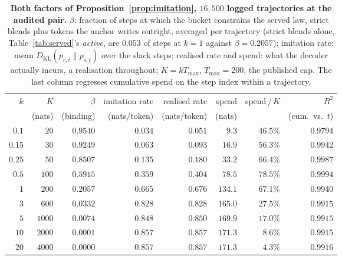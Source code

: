 \begin{table}[h]
\centering\footnotesize
\caption{\textbf{Both factors of Proposition~\ref{prop:imitation}, $16{,}500$ logged trajectories at the
audited pair.} $\beta$: fraction of steps at which the bucket constrains the served law, strict blends
plus tokens the anchor writes outright, averaged per trajectory (strict blends alone, Table~\ref{tab:served}'s
\emph{active}, are $0.053$ of steps at $k=1$ against $\beta = 0.2057$); imitation rate: mean
$D_{\mathrm{KL}}(p_{r,t}\|p_{s,t})$ over the slack steps; realised rate and spend: what the decoder
actually incurs, a realisation throughout; $K = kT_{\max}$, $T_{\max} = 200$, the published cap. The last
column regresses cumulative spend on the step index within a trajectory.}
\label{tab:imitation}
\setlength{\tabcolsep}{5pt}
\begin{tabular}{rrrrrrrr}
\toprule
$k$ & $K$ & $\beta$ & imitation rate & realised rate & spend & spend\,/\,$K$ & $R^2$ \\
 & (nats) & (binding) & (nats/token) & (nats/token) & (nats) & & (cum.\ vs.\ $t$) \\
\midrule
$0.1$ & $20$ & $0.9540$ & $0.034$ & $0.051$ & $9.3$ & $46.5\%$ & $0.9794$ \\
$0.15$ & $30$ & $0.9249$ & $0.063$ & $0.093$ & $16.9$ & $56.3\%$ & $0.9942$ \\
$0.25$ & $50$ & $0.8507$ & $0.135$ & $0.180$ & $33.2$ & $66.4\%$ & $0.9987$ \\
$0.5$ & $100$ & $0.5915$ & $0.359$ & $0.404$ & $78.5$ & $78.5\%$ & $0.9994$ \\
$1$ & $200$ & $0.2057$ & $0.665$ & $0.676$ & $134.1$ & $67.1\%$ & $0.9940$ \\
$3$ & $600$ & $0.0332$ & $0.828$ & $0.828$ & $165.0$ & $27.5\%$ & $0.9915$ \\
$5$ & $1000$ & $0.0074$ & $0.848$ & $0.850$ & $169.9$ & $17.0\%$ & $0.9915$ \\
$10$ & $2000$ & $0.0001$ & $0.857$ & $0.857$ & $171.3$ & $8.6\%$ & $0.9915$ \\
$20$ & $4000$ & $0.0000$ & $0.857$ & $0.857$ & $171.3$ & $4.3\%$ & $0.9916$ \\
\bottomrule
\end{tabular}
\end{table}

